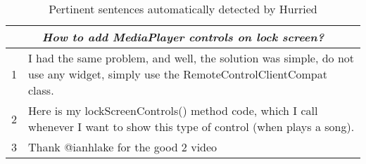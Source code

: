 
\begin{table}[H]
\centering    
\begin{scriptsize}
\begin{threeparttable}
\begin{tabular}{ll}

\hline
\multicolumn{2}{c}{\textit{How to add MediaPlayer controls on lock screen?}} \\
\hline
\hline

1 & \parbox[l][.8cm][c]{10.5cm}{I had the same problem, and well, the solution was simple, do not use any widget, simply use the RemoteControlClientCompat class.} \\
2 & \parbox[l][.8cm][c]{10.5cm}{Here is my lockScreenControls() method code, which I call whenever I want to show this type of control (when plays a song).} \\
3 & \parbox[l][.5cm][c]{10.5cm}{Thank @ianhlake for the good 2 video} \\

\hline


\end{tabular}
\end{threeparttable}
\end{scriptsize}
\caption{Pertinent sentences automatically detected by \acs{Hurried}}
\label{tbl:git-example-hurried}
\end{table}